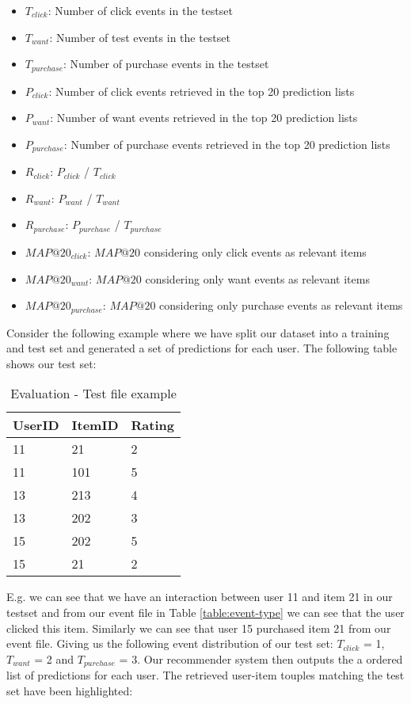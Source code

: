 \begin{itemize}
	\item $T_{click}$: Number of click events in the testset
	\item $T_{want}$: Number of test events in the testset
	\item $T_{purchase}$: Number of purchase events in the testset
	\item $P_{click}$: Number of click events retrieved in the top 20 prediction lists
	\item $P_{want}$: Number of want events retrieved in the top 20 prediction lists
	\item $P_{purchase}$: Number of purchase events retrieved in the top 20 prediction lists
	\item $R_{click}$: $P_{click}$ / $T_{click}$
	\item $R_{want}$: $P_{want}$ / $T_{want}$
	\item $R_{purchase}$: $P_{purchase}$ / $T_{purchase}$
	\item $MAP@20_{click}$: $MAP@20$ considering only click events as relevant items
	\item $MAP@20_{want}$: $MAP@20$ considering only want events as relevant items
	\item $MAP@20_{purchase}$: $MAP@20$ considering only purchase events as relevant items
\end{itemize}

Consider the following example where we have split our dataset into a training and test set and generated a set
of predictions for each user. The following table shows our test set:

\begin{table}[H]
\centering
	\begin{tabular}{*{3}l}
	\toprule
	UserID	&	ItemID	 &  Rating  	\\ \midrule
	11		&	21		 &	2			\\
	11		&	101		 &	5			\\
	13		&	213		 &	4			\\
	13		&	202		 &  3			\\
	15		&	202		 &  5			\\
	15		&	21		 &  2			\\
	\bottomrule
	\end{tabular}
	\caption{Evaluation - Test file example}
\end{table}

E.g. we can see that we have an interaction between user 11 and item 21 in our testset and from our event file in
Table \ref{table:event-type} we can see that the user clicked this item. Similarly we can see that user 15 purchased
item 21 from our event file. Giving us the following event distribution of our test set: $T_{click}$ = 1, $T_{want}$ = 2 and
$T_{purchase}$ = 3. Our recommender system then outputs the a ordered list of predictions for each user. The retrieved user-item touples matching the test set have been highlighted:

